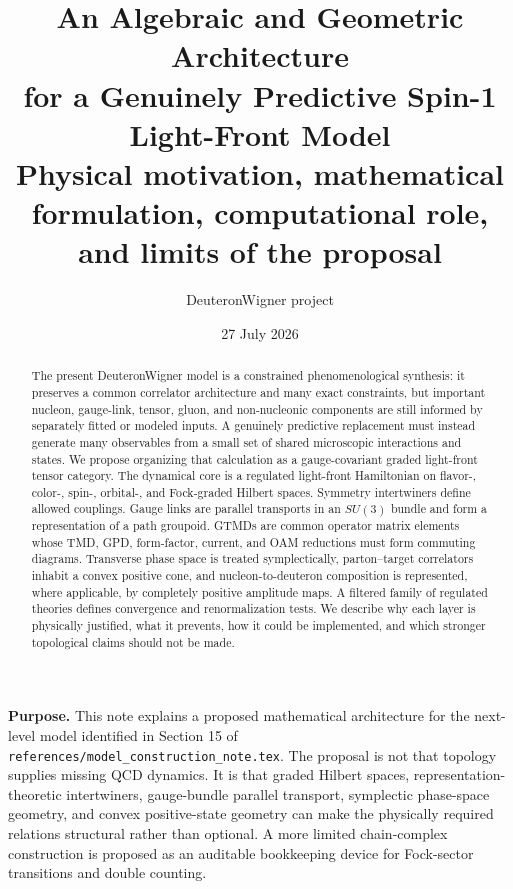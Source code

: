 \documentclass[11pt]{article}
\title{\vspace{-1.0cm}
{\color{navy}\bfseries An Algebraic and Geometric Architecture\\[2mm]
for a Genuinely Predictive Spin-1 Light-Front Model}\\[4mm]
\large Physical motivation, mathematical formulation, computational role,
and limits of the proposal}
\author{DeuteronWigner project}
\date{27 July 2026}
\begin{document}
\maketitle

\begin{center}
\begin{minipage}{0.93\textwidth}
\colorbox{softblue}{\parbox{0.96\textwidth}{
\textbf{Purpose.}
This note explains a proposed mathematical architecture for the next-level
model identified in Section 15 of
\texttt{references/model\_construction\_note.tex}.  The proposal is not that
topology supplies missing QCD dynamics.  It is that graded Hilbert spaces,
representation-theoretic intertwiners, gauge-bundle parallel transport,
symplectic phase-space geometry, and convex positive-state geometry can make
the physically required relations structural rather than optional.  A more
limited chain-complex construction is proposed as an auditable bookkeeping
device for Fock-sector transitions and double counting.
}}
\end{minipage}
\end{center}

\begin{abstract}
The present DeuteronWigner model is a constrained phenomenological synthesis:
it preserves a common correlator architecture and many exact constraints, but
important nucleon, gauge-link, tensor, gluon, and non-nucleonic components are
still informed by separately fitted or modeled inputs.  A genuinely
predictive replacement must instead generate many observables from a small
set of shared microscopic interactions and states.  We propose organizing
that calculation as a gauge-covariant graded light-front tensor category.
The dynamical core is a regulated light-front Hamiltonian on flavor-, color-,
spin-, orbital-, and Fock-graded Hilbert spaces.  Symmetry intertwiners define
allowed couplings.  Gauge links are parallel transports in an \(SU(3)\)
bundle and form a representation of a path groupoid.  GTMDs are common
operator matrix elements whose TMD, GPD, form-factor, current, and OAM
reductions must form commuting diagrams.  Transverse phase space is treated
symplectically, parton--target correlators inhabit a convex positive cone, and
nucleon-to-deuteron composition is represented, where applicable, by
completely positive amplitude maps.  A filtered family of regulated theories
defines convergence and renormalization tests.  We describe why each layer is
physically justified, what it prevents, how it could be implemented, and
which stronger topological claims should not be made.
\end{abstract}
\end{document}
